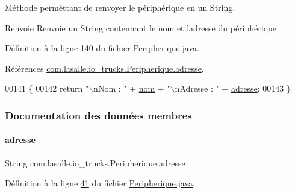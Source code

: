 Méthode perméttant de renvoyer le périphérique en un String. 

\begin{DoxyReturn}{Renvoie}
Renvoie un String contennant le nom et l\textquotesingle{}adresse du périphérique 
\end{DoxyReturn}


Définition à la ligne \hyperlink{_peripherique_8java_source_l00140}{140} du fichier \hyperlink{_peripherique_8java_source}{Peripherique.\+java}.



Références \hyperlink{_peripherique_8java_source_l00041}{com.\+lasalle.\+io\+\_\+trucks.\+Peripherique.\+adresse}.


\begin{DoxyCode}
00141     \{
00142         \textcolor{keywordflow}{return} \textcolor{stringliteral}{"\(\backslash\)nNom : "} + \hyperlink{classcom_1_1lasalle_1_1io__trucks_1_1_peripherique_a57ad735952307998eddf5277be95ec95}{nom} + \textcolor{stringliteral}{"\(\backslash\)nAdresse : "} + \hyperlink{classcom_1_1lasalle_1_1io__trucks_1_1_peripherique_a0f0c207b12d3aded58623cfe0f9cd6d2}{adresse};
00143     \}
\end{DoxyCode}


\subsubsection{Documentation des données membres}
\mbox{\label{classcom_1_1lasalle_1_1io__trucks_1_1_peripherique_a0f0c207b12d3aded58623cfe0f9cd6d2}} 
\paragraph{\texorpdfstring{adresse}{adresse}}
{\footnotesize\ttfamily String com.\+lasalle.\+io\+\_\+trucks.\+Peripherique.\+adresse\hspace{0.3cm}{\ttfamily [private]}}



Définition à la ligne \hyperlink{_peripherique_8java_source_l00041}{41} du fichier \hyperlink{_peripherique_8java_source}{Peripherique.\+java}.



